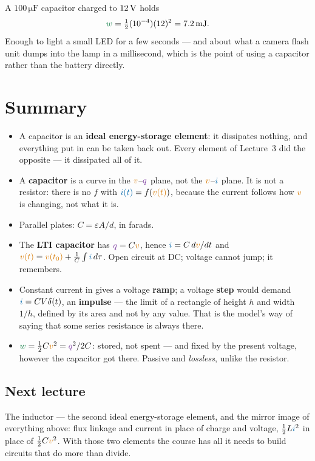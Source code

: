 \documentclass[11pt,a4paper]{article}
\newcommand{\Icol}[1]{\textcolor{ccur}{#1}}
\newcommand{\Vcol}[1]{\textcolor{cvolt}{#1}}
\newcommand{\Pcol}[1]{\textcolor{cpow}{#1}}
\newcommand{\Qcol}[1]{\textcolor{ccharge}{#1}}
\newcommand{\uni}[1]{\,\mathrm{#1}}
\begin{document}
\begin{examplebox}
A $100\uni{\mu F}$ capacitor charged to $12\V$ holds
\[
  \Pcol{w} = \tfrac12 (10^{-4})(12)^2 = 7.2\uni{mJ} .
\]
Enough to light a small LED for a few seconds --- and about what a camera flash unit dumps
into the lamp in a millisecond, which is the point of using a capacitor rather than the
battery directly.
\end{examplebox}

\section*{Summary}

\begin{itemize}
  \item A capacitor is an \textbf{ideal energy-storage element}: it dissipates nothing,
        and everything put in can be taken back out. Every element of Lecture~3 did the
        opposite --- it dissipated all of it.
  \item A \textbf{capacitor} is a curve in the $\Vcol{v}$--$\Qcol{q}$ plane, not the
        $\Vcol{v}$--$\Icol{i}$ plane. It is not a resistor: there is no $f$ with
        $\Icol{i(t)} = f(\Vcol{v(t)})$, because the current follows how $\Vcol{v}$ is
        changing, not what it is.
  \item Parallel plates: $C = \varepsilon A/d$, in farads.
  \item The \textbf{LTI capacitor} has $\Qcol{q} = C\Vcol{v}$, hence
        $\Icol{i} = C\,d\Vcol{v}/dt$ and
        $\Vcol{v(t)} = \Vcol{v(t_0)} + \frac1C\int \Icol{i}\,d\tau$.
        Open circuit at DC; voltage cannot jump; it remembers.
  \item Constant current in gives a voltage \textbf{ramp}; a voltage \textbf{step} would
        demand $\Icol{i} = CV\delta(t)$, an \textbf{impulse} --- the limit of a rectangle
        of height $h$ and width $1/h$, defined by its area and not by any value. That is
        the model's way of saying that some series resistance is always there.
  \item $\Pcol{w} = \tfrac12 C\Vcol{v}^2 = \Qcol{q}^2/2C$: stored, not spent --- and fixed
        by the present voltage, however the capacitor got there. Passive and
        \emph{lossless}, unlike the resistor.
\end{itemize}

\subsection*{Next lecture}
The inductor --- the second ideal energy-storage element, and the mirror image of everything
above: flux linkage and current in place of charge and voltage, $\tfrac12 L\Icol{i}^2$ in
place of $\tfrac12 C\Vcol{v}^2$. With those two elements the course has all it needs to
build circuits that do more than divide.
\end{document}
